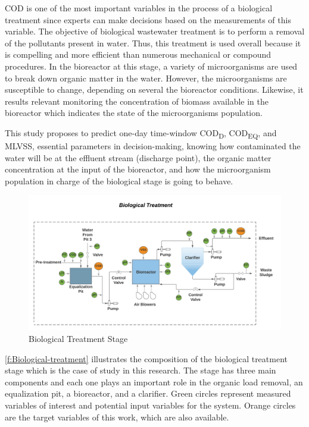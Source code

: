 \ac{COD} is one of the most important variables in the process of a biological treatment since experts can make decisions based on the measurements of this variable. The objective of biological wastewater treatment is to perform a removal of the pollutants present in water. Thus, this treatment is used overall because it is compelling and more efficient than numerous mechanical or compound procedures. In the bioreactor at this stage, a variety of microorganisms are used to break down organic matter in the water. However, the microorganisms are susceptible to change, depending on several the bioreactor conditions. Likewise, it results relevant monitoring the concentration of biomass available in the bioreactor which indicates the state of the microorganisms population.

This study proposes to predict one-day time-window \ac{COD}\textsubscript{D}, \ac{COD}\textsubscript{EQ}, and \ac{MLVSS}, essential parameters in decision-making, knowing how contaminated the water will be at the effluent stream (discharge point), the organic matter concentration at the input of the bioreactor, and how the microorganism population in charge of the biological stage is going to behave. 

\begin{figure}[h]
\centering
\includegraphics[width=\linewidth]{figures/Ch4/Biological-treatment-stage.png}
\caption{Biological Treatment Stage}
\label{f:Biological-treatment}
\end{figure}

\autoref{f:Biological-treatment} illustrates the composition of the biological treatment stage which is the case of study in this research. The stage has three main components and each one plays an important role in the organic load removal, an equalization pit, a bioreactor, and a clarifier. Green circles represent measured variables of interest and potential input variables for the system. Orange circles are the target variables of this work, which are also available.


